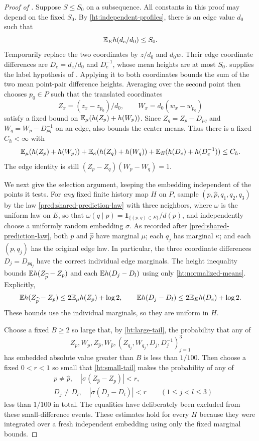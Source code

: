 \begin{proof}[Proof of ]
Suppose $S\le S_0$ on a subsequence. All constants in this proof may
depend on the fixed $S_0$. By \eqref{ht:independent-profiles}, there is an
edge value $d_0$ such that
\[
 \mathbb E_Eh(d_e/d_0)\le S_0.
\]
Temporarily replace the two coordinates by $z/d_0$ and $d_0w$.
Their edge coordinate differences are $D_e=d_e/d_0$ and $D_e^{-1}$, whose mean heights
are at most $S_0$.  supplies the label hypothesis of
. Applying it to both coordinates bounds the sum of
the two mean point-pair difference heights. Averaging over the second
point then chooses $p_0\in P$ such that the translated coordinates
\[
 Z_x=(z_x-z_{p_0})/d_0,\qquad W_x=d_0(w_x-w_{p_0})
\]
satisfy a fixed bound on $\mathbb E_\mu(h(Z_p)+h(W_p))$.
Since $Z_q=Z_p-D_{pq}$ and $W_q=W_p-D_{pq}^{-1}$ on an edge,
 also bounds the center means. Thus there is a fixed
$C_h<\infty$ with
\begin{equation}\label{ht:normalized-means}
 \mathbb E_\mu(h(Z_p)+h(W_p))
 +\mathbb E_\kappa(h(Z_q)+h(W_q))
 +\mathbb E_E(h(D_e)+h(D_e^{-1}))\le C_h.
\end{equation}
The edge identity is still
$(Z_p-Z_q)(W_p-W_q)=1$.

We next give the selection argument, keeping the embedding independent
of the points it tests. For \emph{any} fixed finite history map $H$ on
$P$, sample $(p,\widehat p,q_1,q_2,q_3)$ by the law
\eqref{pred:shared-prediction-law} with three neighbors, where $\omega$
is the uniform law on $E$, so that
$\omega(q\mid p)=\mathbf1_{\{(p,q)\in E\}}/d(p)$,
and independently choose a uniformly random embedding $\sigma$.
As recorded after \eqref{pred:shared-prediction-law},
both $p$ and $\widehat p$ have marginal $\mu$; each $q_j$ has marginal
$\kappa$; and each $(p,q_j)$ has the original edge law.
In particular, the three coordinate differences $D_j=D_{pq_j}$ have the correct individual
edge marginals. The height inequality bounds
$\mathbb E h(Z_{\widehat p}-Z_p)$ and each $\mathbb E h(D_j-D_l)$ using only
\eqref{ht:normalized-means}. Explicitly,
\[
 \mathbb E h(Z_{\widehat p}-Z_p)\le2\mathbb E_\mu h(Z_p)+\log2,
 \qquad
 \mathbb E h(D_j-D_l)\le2\mathbb E_Eh(D_e)+\log2.
\]
These bounds use the individual marginals, so they are uniform in $H$.

Choose a fixed $B\ge2$ so large that, by \eqref{ht:large-tail}, the
probability that any of
\[
 Z_p,W_p,Z_{\widehat p},W_{\widehat p},
 (Z_{q_j},W_{q_j},D_j,D_j^{-1})_{j=1}^3
\]
has embedded absolute value greater than $B$ is less than $1/100$.
Then choose a fixed $0<r<1$ so small that
\eqref{ht:small-tail} makes the probability of any of
\begin{align*}
 &p\ne\widehat p,\quad
        |\sigma(Z_{\widehat p}-Z_p)|<r,\\
 &D_j\ne D_l,\quad |\sigma(D_j-D_l)|<r
       \qquad(1\le j<l\le3)
\end{align*}
less than $1/100$ in total. The equalities have deliberately been excluded
from these small-difference events. These estimates hold for every $H$
because they were integrated over a fresh independent embedding using
only the fixed marginal bounds.


\end{proof}
